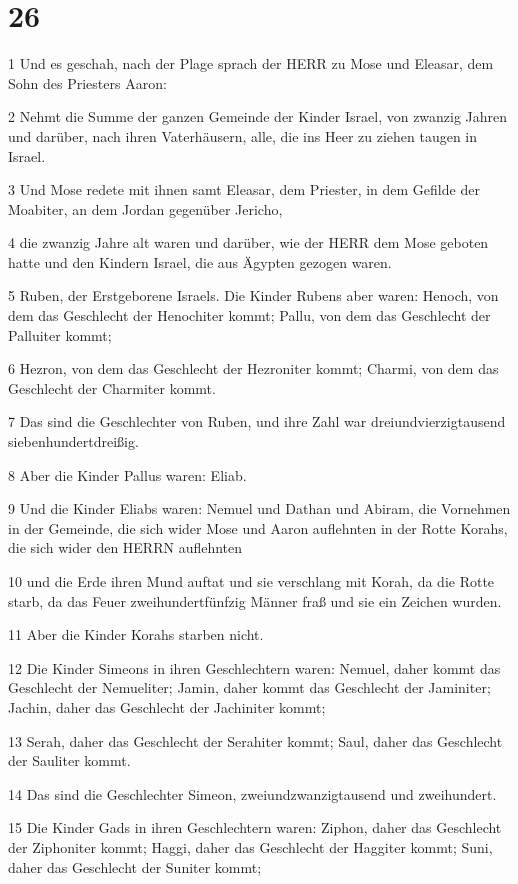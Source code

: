 \chapter{26}

\par 1 Und es geschah, nach der Plage sprach der HERR zu Mose und Eleasar, dem Sohn des Priesters Aaron:
\par 2 Nehmt die Summe der ganzen Gemeinde der Kinder Israel, von zwanzig Jahren und darüber, nach ihren Vaterhäusern, alle, die ins Heer zu ziehen taugen in Israel.
\par 3 Und Mose redete mit ihnen samt Eleasar, dem Priester, in dem Gefilde der Moabiter, an dem Jordan gegenüber Jericho,
\par 4 die zwanzig Jahre alt waren und darüber, wie der HERR dem Mose geboten hatte und den Kindern Israel, die aus Ägypten gezogen waren.
\par 5 Ruben, der Erstgeborene Israels. Die Kinder Rubens aber waren: Henoch, von dem das Geschlecht der Henochiter kommt; Pallu, von dem das Geschlecht der Palluiter kommt;
\par 6 Hezron, von dem das Geschlecht der Hezroniter kommt; Charmi, von dem das Geschlecht der Charmiter kommt.
\par 7 Das sind die Geschlechter von Ruben, und ihre Zahl war dreiundvierzigtausend siebenhundertdreißig.
\par 8 Aber die Kinder Pallus waren: Eliab.
\par 9 Und die Kinder Eliabs waren: Nemuel und Dathan und Abiram, die Vornehmen in der Gemeinde, die sich wider Mose und Aaron auflehnten in der Rotte Korahs, die sich wider den HERRN auflehnten
\par 10 und die Erde ihren Mund auftat und sie verschlang mit Korah, da die Rotte starb, da das Feuer zweihundertfünfzig Männer fraß und sie ein Zeichen wurden.
\par 11 Aber die Kinder Korahs starben nicht.
\par 12 Die Kinder Simeons in ihren Geschlechtern waren: Nemuel, daher kommt das Geschlecht der Nemueliter; Jamin, daher kommt das Geschlecht der Jaminiter; Jachin, daher das Geschlecht der Jachiniter kommt;
\par 13 Serah, daher das Geschlecht der Serahiter kommt; Saul, daher das Geschlecht der Sauliter kommt.
\par 14 Das sind die Geschlechter Simeon, zweiundzwanzigtausend und zweihundert.
\par 15 Die Kinder Gads in ihren Geschlechtern waren: Ziphon, daher das Geschlecht der Ziphoniter kommt; Haggi, daher das Geschlecht der Haggiter kommt; Suni, daher das Geschlecht der Suniter kommt;
